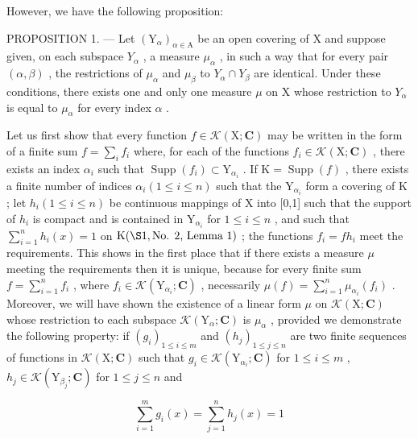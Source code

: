 However, we have the following proposition:

PROPOSITION 1. --- Let \((\mathrm{Y}_{\alpha})_{\alpha\in\mathrm{A}}\) be an open covering of X and suppose given, on each subspace \(Y_{\alpha}\) , a measure \(\mu_{\alpha}\) , in such a way that for every pair \((\alpha,\beta)\) , the restrictions of \(\mu_{\alpha}\) and \(\mu_{\beta}\) to \(Y_{\alpha}\cap Y_{\beta}\) are identical. Under these conditions, there exists one and only one measure \(\mu\) on X whose restriction to \(Y_{\alpha}\) is equal to \(\mu_{\alpha}\) for every index \(\alpha\) .

Let us first show that every function \(f \in \mathcal{K}(\mathrm{X};\mathbf{C})\) may be written in the form of a finite sum \(f = \sum_{i} f_{i}\) where, for each of the functions \(f_{i} \in \mathcal{K}(\mathrm{X};\mathbf{C})\) , there exists an index \(\alpha_{i}\) such that \(\operatorname{Supp}(f_{i}) \subset \mathrm{Y}_{\alpha_{i}}\) . If \(\mathrm{K} = \operatorname{Supp}(f)\) , there exists a finite number of indices \(\alpha_{i} (1 \leqslant i \leqslant n)\) such that the \(\mathrm{Y}_{\alpha_{i}}\) form a covering of \(\mathrm{K}\) ; let \(h_{i} (1 \leqslant i \leqslant n)\) be continuous mappings of \(\mathrm{X}\) into {[}0,1{]} such that the support of \(h_{i}\) is compact and is contained in \(\mathrm{Y}_{\alpha_{i}}\) for \(1 \leqslant i \leqslant n\) , and such that \(\sum_{i=1}^{n} h_{i}(x) = 1\) on \(\mathrm{K} (\S 1, \text{No. 2, Lemma 1})\) ; the functions \(f_{i} = f h_{i}\) meet the requirements. This shows in the first place that if there exists a measure \(\mu\) meeting the requirements then it is unique, because for every finite sum \(f = \sum_{i=1}^{n} f_{i}\) , where \(f_{i} \in \mathcal{K}(\mathrm{Y}_{\alpha_{i}}; \mathbf{C})\) , necessarily \(\mu(f) = \sum_{i=1}^{n} \mu_{\alpha_{i}}(f_{i})\) . Moreover, we will have shown the existence of a linear form \(\mu\) on \(\mathcal{K}(\mathrm{X};\mathbf{C})\) whose restriction to each subspace \(\mathcal{K}(\mathrm{Y}_{\alpha};\mathbf{C})\) is \(\mu_{\alpha}\) , provided we demonstrate the following property: if \((g_{i})_{1 \leqslant i \leqslant m}\) and \((h_{j})_{1 \leqslant j \leqslant n}\) are two finite sequences of functions in \(\mathcal{K}(\mathrm{X};\mathbf{C})\) such that \(g_{i} \in \mathcal{K}(\mathrm{Y}_{\alpha_{i}}; \mathbf{C})\) for \(1 \leqslant i \leqslant m\) , \(h_{j} \in \mathcal{K}(\mathrm{Y}_{\beta_{j}}; \mathbf{C})\) for \(1 \leqslant j \leqslant n\) and

\[
\sum_ {i = 1} ^ {m} g _ {i} (x) = \sum_ {j = 1} ^ {n} h _ {j} (x) = 1
\]

